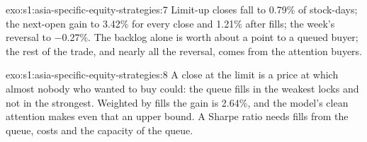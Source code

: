 \begin{solution}{exo:s1:asia-specific-equity-strategies:7}
Limit-up closes fall to 0.79\% of stock-days; the next-open gain to 3.42\% for every close and 1.21\% after fills; the week's reversal to $-0.27\%$. The
backlog alone is worth about a point to a queued buyer; the rest of the trade, and nearly all the reversal, comes from the attention buyers.
\end{solution}

\begin{solution}{exo:s1:asia-specific-equity-strategies:8}
A close at the limit is a price at which almost nobody who wanted to buy could: the queue fills in the weakest locks and not in the strongest. Weighted
by fills the gain is 2.64\%, and the model's clean attention makes even that an upper bound. A Sharpe ratio needs fills from the queue, costs and the
capacity of the queue.
\end{solution}

